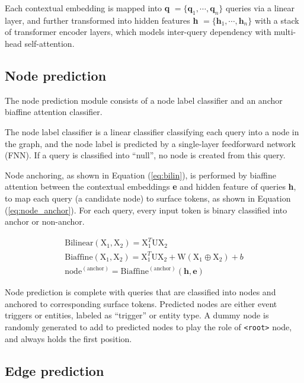 \documentclass[11pt]{article}
\begin{document}
Each contextual embedding is mapped into \textbf{q} $=\{\mathrm{\textbf{q}}_1, \cdots, \mathrm{\textbf{q}}_n\}$ queries via a linear layer, and further transformed into hidden features \textbf{h} $=\{\mathrm{\textbf{h}}_1, \cdots, \mathrm{\textbf{h}}_n\}$ with a stack of transformer encoder layers, which models inter-query dependency with multi-head self-attention. 

\subsection{Node prediction}

The node prediction module consists of a node label classifier and an anchor biaffine attention classifier. 

The node label classifier is a linear classifier classifying each query into a node in the graph, and the node label is predicted by a single-layer feedforward network (FNN). If a query is classified into ``null'', no node is created from this query.

Node anchoring, as shown in Equation (\ref{eq:bilin}), is performed by biaffine attention \citep{dozat-manning-2018-simpler} between the contextual embeddings \textbf{e} and hidden feature of queries \textbf{h}, to map each query (a candidate node) to surface tokens, as shown in Equation (\ref{eq:node_anchor}). For each query, every input token is binary classified into anchor or non-anchor.

{\footnotesize
\begin{gather}
    \label{eq:bilin}
    \mathrm{Bilinear}(\mathrm{X}_1,\mathrm{X}_2) = \mathrm{X}_1^T\mathrm{UX}_2 \\
    \label{eg:biaffin}
    \mathrm{Biaffine}(\mathrm{X}_1,\mathrm{X}_2) = \mathrm{X}_1^T\mathrm{UX}_2 + \mathrm{W}(\mathrm{X}_1 \oplus \mathrm{X}_2) + b \\
    \label{eq:node_anchor}
    \mathrm{node}^{\mathrm{(anchor)}} = \mathrm{Biaffine}^{\mathrm{(anchor)}} (\mathrm{\textbf{h}}, \mathrm{\textbf{e}})
\end{gather}}


Node prediction is complete with queries that are classified into nodes and anchored  to corresponding surface tokens. Predicted nodes are either event triggers or entities, labeled as ``trigger'' or entity type. A dummy node is randomly generated to add to predicted nodes to play the role of \texttt{<root>} node, and always holds the first position. 

\subsection{Edge prediction}
\end{document}
